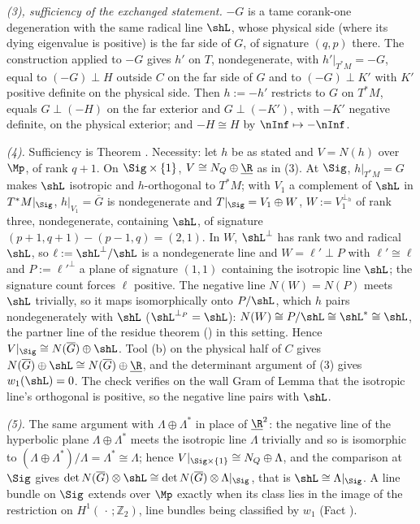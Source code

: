 \emph{(3), sufficiency of the exchanged statement.} $-G$ is a tame corank-one degeneration with the same radical line $\shL$, whose physical side (where its dying eigenvalue is positive) is the far side of $G$, of signature $(q, p)$ there. The construction applied to $-G$ gives $h'$ on $T$, nondegenerate, with $h'|_{T^*M} = -G$, equal to $(-G) \perp H$ outside $C$ on the far side of $G$ and to $(-G) \perp K'$ with $K'$ positive definite on the physical side. Then $h := -h'$ restricts to $G$ on $T^*M$, equals $G \perp (-H)$ on the far exterior and $G \perp (-K')$, with $-K'$ negative definite, on the physical exterior; and $-H \cong H$ by $\nInf \mapsto -\nInf$.

\emph{(4).} Sufficiency is Theorem . Necessity: let $h$ be as stated and $V = N(h)$ over $\Mp$, of rank $q + 1$. On $\Sig \times \{1\}$, $V \cong N_Q \oplus \underline{\R}$ as in (3). At $\Sig$, $h|_{T^*M} = G$ makes $\shL$ isotropic and $h$-orthogonal to $T^*M$; with $V_1$ a complement of $\shL$ in $T^*M|_\Sig$, $h|_{V_1} = \overline G$ is nondegenerate and $T|_\Sig = V_1 \oplus W$, $W := V_1^{\perp_h}$ of rank three, nondegenerate, containing $\shL$, of signature $(p{+}1,q{+}1) - (p{-}1,q) = (2,1)$. In $W$, $\shL^{\perp}$ has rank two and radical $\shL$, so $\ell := \shL^\perp/\shL$ is a nondegenerate line and $W = \ell' \perp P$ with $\ell' \cong \ell$ and $P := \ell'^{\perp}$ a plane of signature $(1,1)$ containing the isotropic line $\shL$; the signature count forces $\ell$ positive. The negative line $N(W) = N(P)$ meets $\shL$ trivially, so it maps isomorphically onto $P/\shL$, which $h$ pairs nondegenerately with $\shL$ ($\shL^{\perp_P} = \shL$): $N(W) \cong P/\shL \cong \shL^* \cong \shL$, the partner line of the residue theorem () in this setting. Hence $V|_\Sig \cong N(\overline G) \oplus \shL$. Tool (b) on the physical half of $C$ gives $N(\overline G) \oplus \shL \cong N(\overline G) \oplus \underline{\R}$, and the determinant argument of (3) gives $w_1(\shL) = 0$. The check verifies on the wall Gram of Lemma  that the isotropic line's orthogonal is positive, so the negative line pairs with $\shL$.

\emph{(5).} The same argument with $\Lambda \oplus \Lambda^*$ in place of $\underline{\R}^2$: the negative line of the hyperbolic plane $\Lambda \oplus \Lambda^*$ meets the isotropic line $\Lambda$ trivially and so is isomorphic to $(\Lambda \oplus \Lambda^*)/\Lambda = \Lambda^* \cong \Lambda$; hence $V|_{\Sig \times \{1\}} \cong N_Q \oplus \Lambda$, and the comparison at $\Sig$ gives $\det N(\overline G) \otimes \shL \cong \det N(\overline G) \otimes \Lambda|_\Sig$, that is $\shL \cong \Lambda|_\Sig$. A line bundle on $\Sig$ extends over $\Mp$ exactly when its class lies in the image of the restriction on $H^1(\,\cdot\,; \mathbb{Z}_2)$, line bundles being classified by $w_1$ (Fact ).

